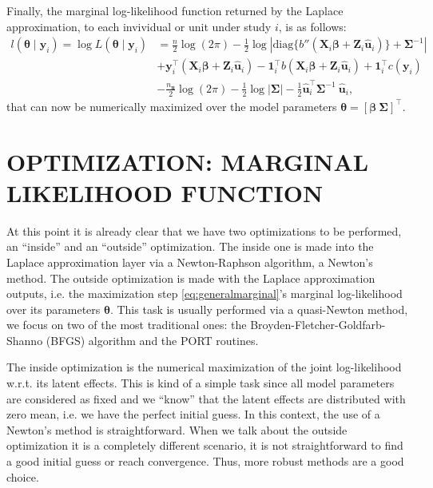 Finally, the marginal log-likelihood function returned by the Laplace
approximation, to each invividual or unit under study \(i\), is as
follows:
\begin{equation}
  \begin{aligned}
    l(\bm{\theta} \mid \mathbf{y}_{i}) =
    \log L(\bm{\theta} \mid \mathbf{y}_{i}) &=
    \frac{n}{2} \log (2\pi) - \frac{1}{2} \log
    \left|
      \text{diag}\{{b}''(\mathbf{X}_{i}\bm{\beta} +
      \mathbf{Z}_{i}\mathbf{\hat{u}}_{i})\} + \bm{\Sigma}^{-1}
    \right|\\
    &+ \mathbf{y}_{i}^{\top}
    (\mathbf{X}_{i}\bm{\beta} + \mathbf{Z}_{i}\mathbf{\hat{u}}_{i}) -
    \mathbf{1}_{i}^{\top}
    b(\mathbf{X}_{i}\bm{\beta} + \mathbf{Z}_{i}\mathbf{\hat{u}}_{i}) +
    \mathbf{1}_{i}^{\top} c(\mathbf{y}_{i})\\
    &- \frac{n_{\mathbf{u}}}{2} \log (2\pi) -
    \frac{1}{2} \log |\bm{\Sigma}| - \frac{1}{2}
    \mathbf{\hat{u}}_{i}^{\top}\bm{\Sigma}^{-1}~\mathbf{\hat{u}}_{i},
  \end{aligned}
  \nonumber
\end{equation}
that can now be numerically maximized over the model parameters
\(\bm{\theta} = [\bm{\beta}~\bm{\Sigma}]^{\top}\).

\section{OPTIMIZATION: MARGINAL LIKELIHOOD FUNCTION}
\label{cap:opt}

At this point it is already clear that we have two optimizations to be
performed, an ``inside'' and an ``outside'' optimization. The inside one
is made into the Laplace approximation layer via a Newton-Raphson
algorithm, a Newton's method. The outside optimization is made with the
Laplace approximation outputs, i.e. the maximization step
\autoref{eq:generalmarginal}'s marginal log-likelihood over its
parameters \(\bm{\theta}\). This task is usually performed via a
quasi-Newton method, we focus on two of the most traditional ones: the
Broyden-Fletcher-Goldfarb-Shanno (BFGS) algorithm and the PORT routines.

The inside optimization is the numerical maximization of the joint
log-likelihood w.r.t. its latent effects. This is kind of a simple task
since all model parameters are considered as fixed and we ``know'' that
the latent effects are distributed with zero mean, i.e. we have the
perfect initial guess. In this context, the use of a Newton's method is
straightforward. When we talk about the outside optimization it is a
completely different scenario, it is not straightforward to find a good
initial guess or reach convergence. Thus, more robust methods are a good
choice.

